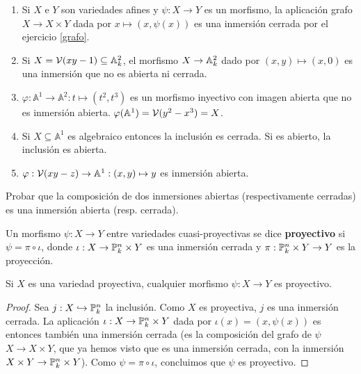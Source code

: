 \documentclass[ACGA.tex]{subfiles}
\begin{document}
\begin{ejs}
 \begin{enumerate}
  \item Si $X$ e $Y$ son variedades afines y $\psi:X\to Y$ es un morfismo, la aplicación grafo $X\to X\times Y$ dada por $x\mapsto (x,\psi(x))$ es una inmersión cerrada por el ejercicio \ref{grafo}.
  \item Si $X=\mathcal{V}(xy-1)\subseteq\mathbb{A}^2_k$, el morfismo $X\to\mathbb{A}^2_k$ dado por $(x,y)\mapsto (x,0)$ es una inmersión que no es abierta ni cerrada. 
  \item $\varphi:\mathbb{A}^1\to\mathbb{A}^2:t\mapsto(t^2,t^3)$ es un morfismo inyectivo con imagen abierta que no es inmersión abierta. $\varphi(\mathbb{A}^1)=\mathcal{V}(y^2-x^3)=X$. 
  \item Si $X\subseteq\mathbb{A}^1$ es algebraico entonces la inclusión es cerrada. Si es abierto, la inclusión es abierta.
  \item $\varphi:\mathcal{V}(xy-z)\to\mathbb{A}^1:(x,y)\mapsto y$ es inmersión abierta.
 \end{enumerate}
\end{ejs}


\begin{ejer}
 Probar que la composición de dos inmersiones abiertas (respectivamente cerradas) es una inmersión abierta (resp. cerrada).
\end{ejer}

\begin{defi}
 Un morfismo $\psi:X\to Y$ entre variedades cuasi-proyectivas se dice {\bf proyectivo} si $\psi=\pi\circ\iota$, donde $\iota:X\to \mathbb{P}^n_k\times Y$ es una inmersión cerrada y $\pi:\mathbb{P}^n_k\times Y\to Y$ es la proyección.
\end{defi}

\begin{prop}
 Si $X$ es una variedad proyectiva, cualquier morfismo $\psi:X\to Y$ es proyectivo.
\end{prop}

\begin{proof}
 Sea $j:X\hookrightarrow\mathbb{P}^n_k$ la inclusión. Como $X$ es proyectiva, $j$ es una inmersión cerrada. La aplicación $\iota:X\to \mathbb{P}^n_k\times Y$ dada por $\iota(x)=(x,\psi(x))$ es entonces también una inmersión cerrada (es  la composición del grafo de $\psi$ $X\to X\times Y$, que ya hemos visto que es una inmersión cerrada, con la inmersión $X\times Y\to\mathbb{P}^n_k\times Y$). Como $\psi=\pi\circ\iota$, concluimos que $\psi$ es proyectivo. 
\end{proof}
\end{document}
